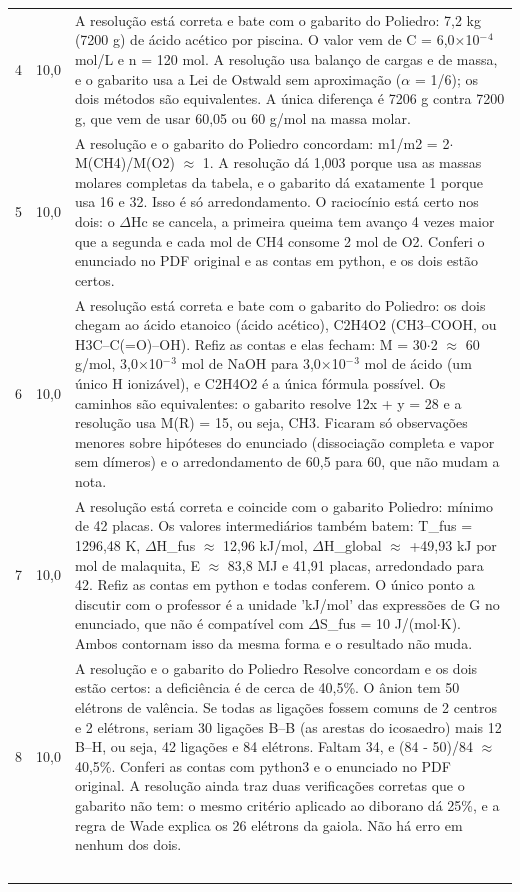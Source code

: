 \documentclass{article}%
\begin{document}
\begin{longtable}{@{}c c p{}@{}}
4 & 10,0 & A resolução está correta e bate com o gabarito do Poliedro: 7,2 kg (7200 g) de ácido acético por piscina. O valor vem de C = 6,0$\times$10$^{-}$$^{4}$ mol/L e n = 120 mol. A resolução usa balanço de cargas e de massa, e o gabarito usa a Lei de Ostwald sem aproximação ($\alpha$ = 1/6); os dois métodos são equivalentes. A única diferença é 7206 g contra 7200 g, que vem de usar 60,05 ou 60 g/mol na massa molar. \\
5 & 10,0 & A resolução e o gabarito do Poliedro concordam: m1/m2 = 2$\cdot$M(CH4)/M(O2) $\approx$ 1. A resolução dá 1,003 porque usa as massas molares completas da tabela, e o gabarito dá exatamente 1 porque usa 16 e 32. Isso é só arredondamento. O raciocínio está certo nos dois: o $\Delta$Hc se cancela, a primeira queima tem avanço 4 vezes maior que a segunda e cada mol de CH4 consome 2 mol de O2. Conferi o enunciado no PDF original e as contas em python, e os dois estão certos. \\
6 & 10,0 & A resolução está correta e bate com o gabarito do Poliedro: os dois chegam ao ácido etanoico (ácido acético), C2H4O2 (CH3--COOH, ou H3C--C(=O)--OH). Refiz as contas e elas fecham: M = 30$\cdot$2 $\approx$ 60 g/mol, 3,0$\times$10$^{-}$$^3$ mol de NaOH para 3,0$\times$10$^{-}$$^3$ mol de ácido (um único H ionizável), e C2H4O2 é a única fórmula possível. Os caminhos são equivalentes: o gabarito resolve 12x + y = 28 e a resolução usa M(R) = 15, ou seja, CH3. Ficaram só observações menores sobre hipóteses do enunciado (dissociação completa e vapor sem dímeros) e o arredondamento de 60,5 para 60, que não mudam a nota. \\
7 & 10,0 & A resolução está correta e coincide com o gabarito Poliedro: mínimo de 42 placas. Os valores intermediários também batem: T\_fus = 1296,48 K, $\Delta$H\_fus $\approx$ 12,96 kJ/mol, $\Delta$H\_global $\approx$ +49,93 kJ por mol de malaquita, E $\approx$ 83,8 MJ e 41,91 placas, arredondado para 42. Refiz as contas em python e todas conferem. O único ponto a discutir com o professor é a unidade 'kJ/mol' das expressões de G no enunciado, que não é compatível com $\Delta$S\_fus = 10 J/(mol$\cdot$K). Ambos contornam isso da mesma forma e o resultado não muda. \\
8 & 10,0 & A resolução e o gabarito do Poliedro Resolve concordam e os dois estão certos: a deficiência é de cerca de 40,5\%. O ânion tem 50 elétrons de valência. Se todas as ligações fossem comuns de 2 centros e 2 elétrons, seriam 30 ligações B--B (as arestas do icosaedro) mais 12 B--H, ou seja, 42 ligações e 84 elétrons. Faltam 34, e (84 - 50)/84 $\approx$ 40,5\%. Conferi as contas com python3 e o enunciado no PDF original. A resolução ainda traz duas verificações corretas que o gabarito não tem: o mesmo critério aplicado ao diborano dá 25\%, e a regra de Wade explica os 26 elétrons da gaiola. Não há erro em nenhum dos dois. \\
$$
\end{longtable}
\end{document}

